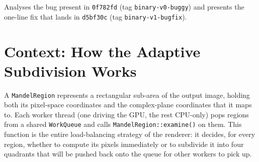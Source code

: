 \documentclass[
	english,
	letterpaper, oneside
]{article}
\begin{document}
\templatePagecfg

\templateFinalcfg


\inserttitle

\begin{center}\small\textsf{%
Analyses the bug present in \texttt{0f782fd} (tag \texttt{binary-v0-buggy}) and presents the one-line fix that lands in \texttt{d5bf30c} (tag \texttt{binary-v1-bugfix}).%
}\end{center}

\begin{abstract}
This report documents a latent correctness bug in
\texttt{MandelRegion::examine()}, the function at the heart of the
adaptive load-balancing strategy used by \texttt{mandelHybrid}. The bug
lies in the loop that computes the minimum and maximum
iteration counts across the four corners of a region: by chaining the
two updates with an \texttt{else if}, the original code makes max-tracking
unreachable on the first iteration and on every subsequent iteration where
a new minimum is found. As a consequence, regions whose largest corner
value happens to be the upper-right corner are systematically misclassified
as ``uniform'' and computed in a single pass, even when they straddle a
high-iteration boundary filament. The bug coexists with—and very likely
contributed to—the 15.3~s worst-case CPU region observed in the original
profiling run. We describe the role of \texttt{examine()} in the
hybrid renderer, walk through the failure modes of the original loop on
representative corner-value patterns, and present a one-line fix that
restores correct independent tracking of \texttt{minIter} and
\texttt{maxIter}.
\end{abstract}

\section{Context: How the Adaptive Subdivision Works}

A \texttt{MandelRegion} represents a rectangular sub-area of the output
image, holding both its pixel-space coordinates and the complex-plane
coordinates that it maps to. Each worker thread (one driving the GPU,
the rest CPU-only) pops regions from a shared \texttt{WorkQueue} and calls
\texttt{MandelRegion::examine()} on them. This function is the entire
load-balancing strategy of the renderer: it decides, for every region,
whether to compute its pixels immediately or to subdivide it into four
quadrants that will be pushed back onto the queue for other workers to
pick up.
\end{document}
